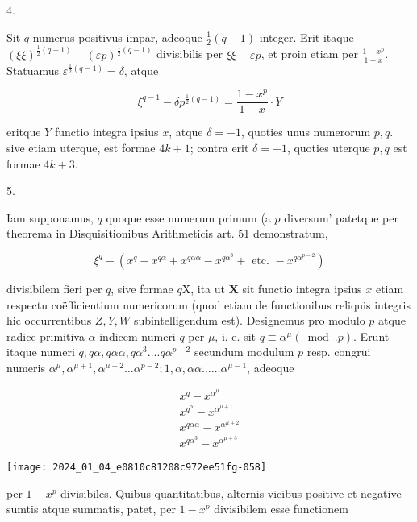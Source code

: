 \documentclass[10pt]{article}
\begin{document}
4.

Sit \(q\) numerus positivus impar, adeoque \(\frac{1}{2}(q-1)\) integer. Erit itaque \((\xi \xi)^{\frac{1}{2}(q-1)}-(\varepsilon p)^{\frac{1}{2}(q-1)}\) divisibilis per \(\xi \xi-\varepsilon p\), et proin etiam per \(\frac{1-x^{p}}{1-x}\). Statuamus \(\varepsilon^{\frac{1}{2}(q-1)}=\delta\), atque

\[
\xi^{q-1}-\delta p^{\frac{1}{2}(q-1)}=\frac{1-x^{p}}{1-x} \cdot Y
\]

eritque \(Y\) functio integra ipsius \(x\), atque \(\delta=+1\), quoties unus numerorum \(p, q\). sive etiam uterque, est formae \(4 k+1\); contra erit \(\delta=-1\), quoties uterque \(p, q\) est formae \(4 k+3\).

5.

Iam supponamus, \(q\) quoque esse numerum primum (a \(p\) diversum' patetque per theorema in Disquisitionibus Arithmeticis art. 51 demonstratum,

\[
\xi^{q}-\left(x^{q}-x^{q \alpha}+x^{q \alpha \alpha}-x^{q \alpha^{3}}+\text { etc. }-x^{q \alpha^{p-2}}\right)
\]

divisibilem fieri per \(q\), sive formae \(q \mathrm{X}\), ita ut \(\mathbf{X}\) sit functio integra ipsius \(x\) etiam respectu coëfficientium numericorum (quod etiam de functionibus reliquis integris hic occurrentibus \(Z, Y, W\) subintelligendum est). Designemus pro modulo \(p\) atque radice primitiva \(\alpha\) indicem numeri \(q\) per \(\mu\), i. e. sit \(q \equiv \alpha^{\mu}(\bmod . p)\). Erunt itaque numeri \(q, q \alpha, q \alpha \alpha, q \alpha^{3} \ldots . q \alpha^{p-2}\) secundum modulum \(p\) resp. congrui numeris \(\alpha^{\mu}, \alpha^{\mu+1}, \alpha^{\mu+2} \ldots \alpha^{p-2} ; 1, \alpha, \alpha \alpha \ldots \ldots \alpha^{\mu-1}\), adeoque

\[
\begin{gathered}
x^{q}-x^{\alpha^{\mu}} \\
x^{q^{\alpha}}-x^{\alpha^{\mu+1}} \\
x^{q \alpha \alpha}-x^{\alpha^{\mu+2}} \\
x^{q \alpha^{3}}-x^{\alpha^{\mu+3}}
\end{gathered}
\]

\begin{center}
\texttt{[image: 2024\_01\_04\_e0810c81208c972ee51fg-058]}
\end{center}

per \(1-x^{p}\) divisibiles. Quibus quantitatibus, alternis vicibus positive et negative sumtis atque summatis, patet, per \(1-x^{p}\) divisibilem esse functionem
\end{document}
